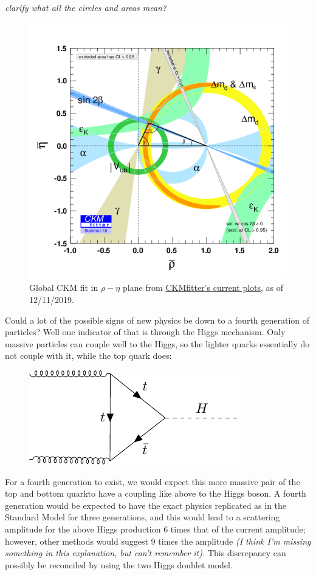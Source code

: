 \documentclass[a4paper, 11pt, normalem]{article}
\begin{document}
\textit{clarify what all the circles and areas mean?}
\begin{figure}[H]
    \centering
    \includegraphics[scale=0.6]{rhoeta_large.png}
    \caption{Global CKM fit in $\rho-\eta$ plane from \href{http://ckmfitter.in2p3.fr/www/results/plots_summer18/ckm_res_summer18.html}{CKMfitter's current plots}, as of 12/11/2019.}
\end{figure}

Could a lot of the possible signs of new physics be down to a fourth generation of particles?
Well one indicator of that is through the Higgs mechanism.
Only massive particles can couple well to the Higgs, so the lighter quarks essentially do not couple with it, while the top quark does:
\begin{figure}[H]
    \centering
    \includegraphics{higgs.pdf}
\end{figure}
For a fourth generation to exist, we would expect this more massive pair of the top and bottom quarkto have a coupling like above to the Higgs boson. 
A fourth generation would be expected to have the exact physics replicated as in the Standard Model for three generations, and this would lead to a scattering amplitude for the above Higgs production 6 times that of the current amplitude; however, other methods would suggest 9 times the amplitude \textit{(I think I'm missing something in this explanation, but can't remember it).}
This discrepancy can possibly be reconciled by using the two Higgs doublet model.
\end{document}
